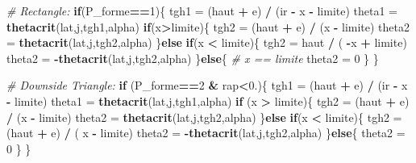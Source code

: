 \documentclass[
]{book}
\newenvironment{Shaded}{\begin{snugshade}}{\end{snugshade}}
\newcommand{\CommentTok}[1]{\textcolor[rgb]{0.56,0.35,0.01}{\textit{#1}}}
\newcommand{\ControlFlowTok}[1]{\textcolor[rgb]{0.13,0.29,0.53}{\textbf{#1}}}
\newcommand{\DecValTok}[1]{\textcolor[rgb]{0.00,0.00,0.81}{#1}}
\newcommand{\FloatTok}[1]{\textcolor[rgb]{0.00,0.00,0.81}{#1}}
\newcommand{\KeywordTok}[1]{\textcolor[rgb]{0.13,0.29,0.53}{\textbf{#1}}}
\newcommand{\NormalTok}[1]{#1}
\newcommand{\OperatorTok}[1]{\textcolor[rgb]{0.81,0.36,0.00}{\textbf{#1}}}
\newcommand{\StringTok}[1]{\textcolor[rgb]{0.31,0.60,0.02}{#1}}
\begin{document}
\begin{Shaded}
\begin{Highlighting}[]
  \CommentTok{# Rectangle:}
  \ControlFlowTok{if}\NormalTok{(P_forme}\OperatorTok{==}\DecValTok{1}\NormalTok{)\{}
\NormalTok{    tgh1 =}\StringTok{ }\NormalTok{(haut }\OperatorTok{+}\StringTok{ }\NormalTok{e) }\OperatorTok{/}\StringTok{ }\NormalTok{(ir }\OperatorTok{-}\StringTok{ }\NormalTok{x }\OperatorTok{-}\StringTok{ }\NormalTok{limite)}
\NormalTok{    theta1 =}\StringTok{ }\KeywordTok{thetacrit}\NormalTok{(lat,j,tgh1,alpha)}
    \ControlFlowTok{if}\NormalTok{(x}\OperatorTok{>}\NormalTok{limite)\{}
\NormalTok{      tgh2 =}\StringTok{ }\NormalTok{(haut }\OperatorTok{+}\StringTok{ }\NormalTok{e) }\OperatorTok{/}\StringTok{ }\NormalTok{(x }\OperatorTok{-}\StringTok{ }\NormalTok{limite)}
\NormalTok{      theta2 =}\StringTok{ }\KeywordTok{thetacrit}\NormalTok{(lat,j,tgh2,alpha)}
\NormalTok{    \}}\ControlFlowTok{else} \ControlFlowTok{if}\NormalTok{(x }\OperatorTok{<}\StringTok{ }\NormalTok{limite)\{}
\NormalTok{      tgh2 =}\StringTok{ }\NormalTok{haut }\OperatorTok{/}\StringTok{ }\NormalTok{( }\OperatorTok{-}\NormalTok{x }\OperatorTok{+}\StringTok{ }\NormalTok{limite)}
\NormalTok{      theta2 =}\StringTok{ }\OperatorTok{-}\KeywordTok{thetacrit}\NormalTok{(lat,j,tgh2,alpha)}
\NormalTok{    \}}\ControlFlowTok{else}\NormalTok{\{}
      \CommentTok{# x == limite}
\NormalTok{      theta2 =}\StringTok{ }\DecValTok{0}
\NormalTok{    \}}
\NormalTok{  \}}
  
  \CommentTok{# Downside Triangle:}
  \ControlFlowTok{if}\NormalTok{ (P_forme}\OperatorTok{==}\DecValTok{2} \OperatorTok{&}\StringTok{ }\NormalTok{rap}\OperatorTok{<}\FloatTok{0.}\NormalTok{)\{}
\NormalTok{    tgh1 =}\StringTok{ }\NormalTok{(haut }\OperatorTok{+}\StringTok{ }\NormalTok{e) }\OperatorTok{/}\StringTok{ }\NormalTok{(ir }\OperatorTok{-}\StringTok{ }\NormalTok{x }\OperatorTok{-}\StringTok{ }\NormalTok{limite)}
\NormalTok{    theta1 =}\StringTok{ }\KeywordTok{thetacrit}\NormalTok{(lat,j,tgh1,alpha)}
    \ControlFlowTok{if}\NormalTok{ (x }\OperatorTok{>}\StringTok{ }\NormalTok{limite)\{}
\NormalTok{      tgh2 =}\StringTok{ }\NormalTok{(haut }\OperatorTok{+}\StringTok{ }\NormalTok{e) }\OperatorTok{/}\StringTok{ }\NormalTok{(x }\OperatorTok{-}\StringTok{ }\NormalTok{limite)}
\NormalTok{      theta2 =}\StringTok{ }\KeywordTok{thetacrit}\NormalTok{(lat,j,tgh2,alpha)}
\NormalTok{    \}}\ControlFlowTok{else} \ControlFlowTok{if}\NormalTok{(x }\OperatorTok{<}\StringTok{ }\NormalTok{limite)\{}
\NormalTok{      tgh2 =}\StringTok{ }\NormalTok{(haut }\OperatorTok{+}\StringTok{ }\NormalTok{e) }\OperatorTok{/}\StringTok{ }\NormalTok{( x }\OperatorTok{-}\StringTok{ }\NormalTok{limite)}
\NormalTok{      theta2 =}\StringTok{ }\OperatorTok{-}\KeywordTok{thetacrit}\NormalTok{(lat,j,tgh2,alpha)}
\NormalTok{    \}}\ControlFlowTok{else}\NormalTok{\{}
\NormalTok{      theta2 =}\StringTok{ }\DecValTok{0}
\NormalTok{    \}}
\NormalTok{  \}}
  

\end{Highlighting}
\end{Shaded}
\end{document}

